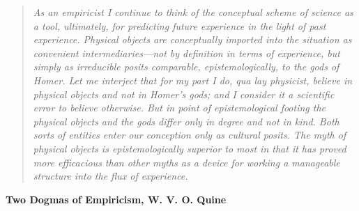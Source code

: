 \documentclass{article}
\theoremstyle{named}
\theoremstyle{remark}
\theoremstyle{definition}
\begin{document}
\listoftodos
{}

\clearpage

\thispagestyle{empty}
\null\vfill
\begin{quote}
    \itshape
    As an empiricist I continue to think of the conceptual scheme of science as a tool, ultimately, for predicting future experience
    in the light of past experience. Physical objects are conceptually imported into the situation as convenient intermediaries—not
    by definition in terms of experience, but simply as irreducible posits comparable, epistemologically, to the gods of Homer. 
    Let me interject that for my part I do, \textit{qua} lay physicist, believe in physical objects and not in Homer’s gods; and I
    consider it a scientific error to believe otherwise. But in point of epistemological footing the physical objects and the 
    gods differ only in degree and not in kind. Both sorts of entities enter our conception only as cultural posits. The myth of
    physical objects is epistemologically superior to most in that it has proved more efficacious than other myths as a device
    for working a manageable structure into the flux of experience.

    \end{quote}
    
    \begin{flushright}
    \textbf{Two Dogmas of Empiricism, W. V. O. Quine}
    \end{flushright}

\vfill\vfill

\clearpage
\end{document}
